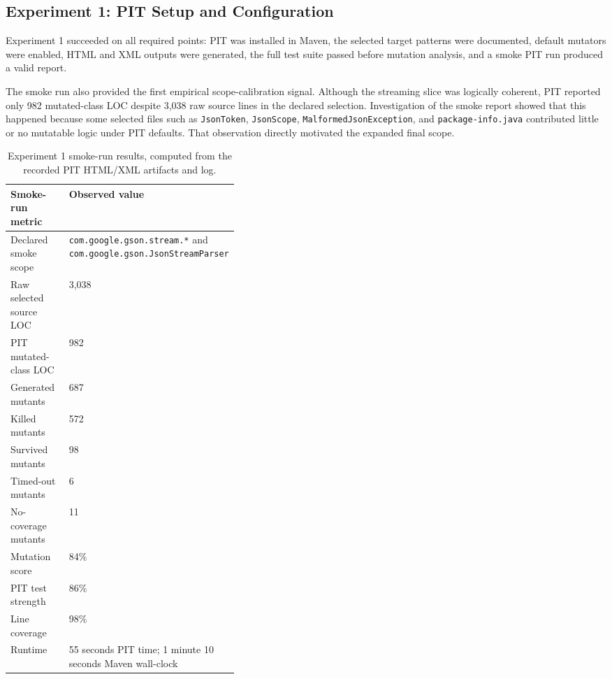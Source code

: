 \documentclass[11pt]{article}
\begin{document}
\subsection{Experiment 1: PIT Setup and Configuration}
Experiment 1 succeeded on all required points: PIT was installed in Maven, the selected target patterns were documented, default mutators were enabled, HTML and XML outputs were generated, the full test suite passed before mutation analysis, and a smoke PIT run produced a valid report.

The smoke run also provided the first empirical scope-calibration signal. Although the streaming slice was logically coherent, PIT reported only 982 mutated-class LOC despite 3,038 raw source lines in the declared selection. Investigation of the smoke report showed that this happened because some selected files such as \texttt{JsonToken}, \texttt{JsonScope}, \texttt{MalformedJsonException}, and \texttt{package-info.java} contributed little or no mutatable logic under PIT defaults. That observation directly motivated the expanded final scope.

\begin{table}[H]
\centering
\small
\begin{tabularx}{\linewidth}{>{\raggedright\arraybackslash}p{0.38\linewidth}X}
\toprule
Smoke-run metric & Observed value \\
\midrule
Declared smoke scope & \texttt{com.google.gson.stream.*} and \texttt{com.google.gson.JsonStreamParser} \\
Raw selected source LOC & 3,038 \\
PIT mutated-class LOC & 982 \\
Generated mutants & 687 \\
Killed mutants & 572 \\
Survived mutants & 98 \\
Timed-out mutants & 6 \\
No-coverage mutants & 11 \\
Mutation score & 84\% \\
PIT test strength & 86\% \\
Line coverage & 98\% \\
Runtime & 55 seconds PIT time; 1 minute 10 seconds Maven wall-clock \\
\bottomrule
\end{tabularx}
\caption{Experiment 1 smoke-run results, computed from the recorded PIT HTML/XML artifacts and log.}
\end{table}
\end{document}
